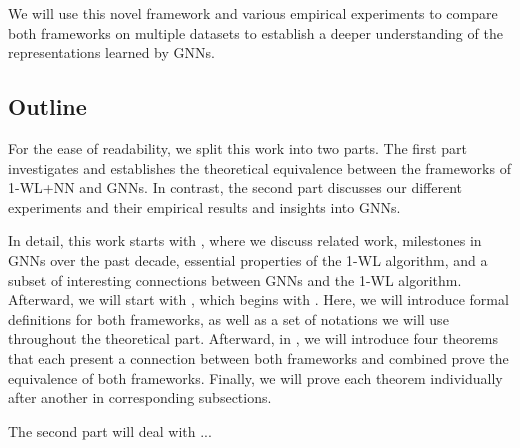 We will use this novel framework and various empirical experiments to compare both frameworks on multiple datasets to establish a deeper understanding of the representations learned by GNNs.

\subsection{Outline}
For the ease of readability, we split this work into two parts. The first part investigates and establishes the theoretical equivalence between the frameworks of 1-WL+NN and GNNs. In contrast, the second part discusses our different experiments and their empirical results and insights into GNNs.

In detail, this work starts with , where we discuss related work, milestones in GNNs over the past decade, essential properties of the 1-WL algorithm, and a subset of interesting connections between GNNs and the 1-WL algorithm. Afterward, we will start with , which begins with . Here, we will introduce formal definitions for both frameworks, as well as a set of notations we will use throughout the theoretical part. Afterward, in , we will introduce four theorems that each present a connection between both frameworks and combined prove the equivalence of both frameworks. Finally, we will prove each theorem individually after another in corresponding subsections.

The second part will deal with ...